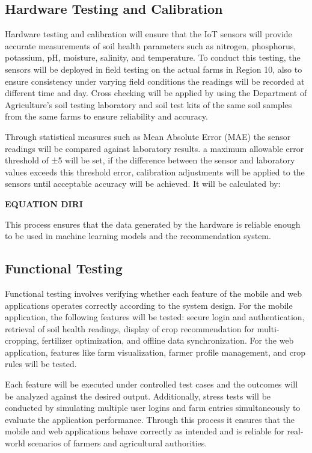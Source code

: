 {	\subsection{Hardware Testing and Calibration}
	Hardware testing and calibration will ensure that the IoT sensors will provide accurate measurements of soil health parameters such as nitrogen, phosphorus, potassium, pH, moisture, salinity, and temperature. To conduct this testing, the sensors will be deployed in field testing on the actual farms in Region 10, also to ensure consistency under varying field conditions the readings will be recorded at different time and day. Cross checking will be applied by using the Department of Agriculture’s soil testing laboratory and soil test kits of the same soil samples from the same farms to ensure reliability and accuracy.
	
	Through statistical measures such as Mean Absolute Error (MAE) the sensor readings will be compared against laboratory results. a maximum allowable error threshold of ±5 will be set, if the difference between the sensor and laboratory values exceeds this threshold error, calibration adjustments will be applied to the sensors until acceptable accuracy will be achieved. It will be calculated by:
	
	
	\textbf{EQUATION DIRI}
	
	This process ensures that the data generated by the hardware is reliable enough to be used in machine learning models and the recommendation system.
	
	\subsection{Functional Testing}
	Functional testing involves verifying whether each feature of the mobile and web applications operates correctly according to the system design. For the mobile application, the following features will be tested: secure login and authentication, retrieval of soil health readings, display of crop recommendation for multi-cropping, fertilizer optimization, and offline data synchronization. For the web application, features like farm visualization, farmer profile management, and crop rules will be tested.
	
	Each feature will be executed under controlled test cases and the outcomes will be analyzed against the desired output. Additionally, stress tests will be conducted by simulating multiple user logins and farm entries simultaneously to evaluate the application performance. Through this process it ensures that the mobile and web applications behave correctly as intended and is reliable for real-world scenarios of farmers and agricultural authorities.
	
}
